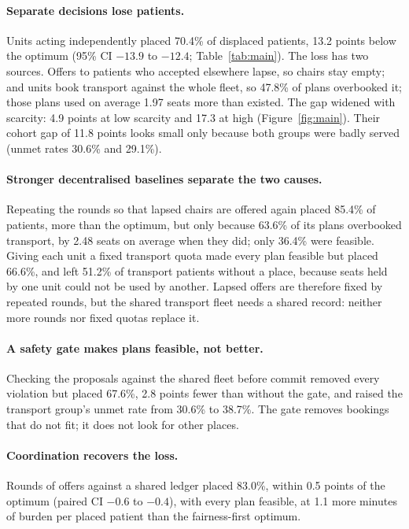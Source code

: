 \documentclass[11pt,a4paper]{article}
\begin{document}
\paragraph{Separate decisions lose patients.} Units acting independently placed 70.4\% of displaced
patients, 13.2 points below the optimum (95\% CI $-13.9$ to $-12.4$; Table~\ref{tab:main}). The loss has two
sources. Offers to patients who accepted elsewhere lapse, so chairs stay empty; and units book transport
against the whole fleet, so 47.8\% of plans overbooked it; those plans used on average 1.97 seats more than
existed. The gap widened with
scarcity: 4.9 points at low scarcity and 17.3 at high (Figure~\ref{fig:main}). Their cohort gap of 11.8 points
looks small only because both groups were badly served (unmet rates 30.6\% and 29.1\%).

\paragraph{Stronger decentralised baselines separate the two causes.} Repeating the rounds so that lapsed
chairs are offered again placed 85.4\% of patients, more than the optimum, but only because 63.6\% of its plans
overbooked transport, by 2.48 seats on average when they did; only 36.4\% were feasible. Giving each unit a fixed
transport quota made every plan feasible but placed 66.6\%, and left 51.2\% of transport patients without a
place, because seats held by one unit could not be used by another. Lapsed offers are therefore fixed by
repeated rounds, but the shared transport fleet needs a shared record: neither more rounds nor fixed quotas
replace it.

\paragraph{A safety gate makes plans feasible, not better.} Checking the proposals against the shared fleet
before commit removed every violation but placed 67.6\%, 2.8 points fewer than without the gate, and raised
the transport group's unmet rate from 30.6\% to 38.7\%. The gate removes bookings that do not fit; it does not
look for other places.

\paragraph{Coordination recovers the loss.} Rounds of offers against a shared ledger placed 83.0\%, within 0.5
points of the optimum (paired CI $-0.6$ to $-0.4$), with every plan feasible, at 1.1 more minutes of burden per
placed patient than the fairness-first optimum.
\end{document}
